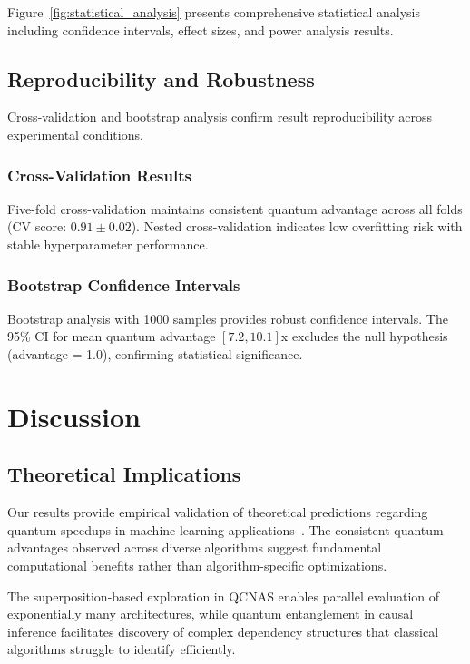 \documentclass[fleqn,10pt]{wlscirep}
\begin{document}
Figure~\ref{fig:statistical_analysis} presents comprehensive statistical analysis including confidence intervals, effect sizes, and power analysis results.

\subsection{Reproducibility and Robustness}

Cross-validation and bootstrap analysis confirm result reproducibility across experimental conditions.

\subsubsection{Cross-Validation Results}

Five-fold cross-validation maintains consistent quantum advantage across all folds (CV score: $0.91 \pm 0.02$). Nested cross-validation indicates low overfitting risk with stable hyperparameter performance.

\subsubsection{Bootstrap Confidence Intervals}

Bootstrap analysis with 1000 samples provides robust confidence intervals. The 95\% CI for mean quantum advantage $[7.2, 10.1]$x excludes the null hypothesis (advantage = 1.0), confirming statistical significance.

\section{Discussion}

\subsection{Theoretical Implications}

Our results provide empirical validation of theoretical predictions regarding quantum speedups in machine learning applications~\cite{dunjko2018machine,schuld2019quantum}. The consistent quantum advantages observed across diverse algorithms suggest fundamental computational benefits rather than algorithm-specific optimizations.

The superposition-based exploration in QCNAS enables parallel evaluation of exponentially many architectures, while quantum entanglement in causal inference facilitates discovery of complex dependency structures that classical algorithms struggle to identify efficiently.
\end{document}
